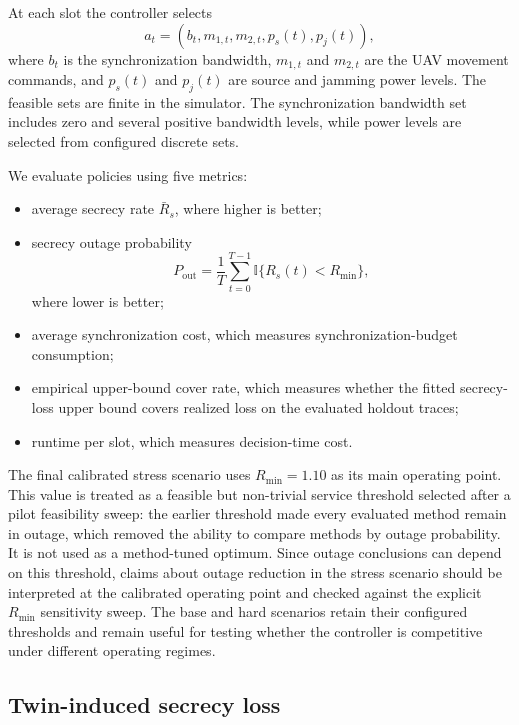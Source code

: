 At each slot the controller selects
\begin{equation}
    a_t=(b_t,m_{1,t},m_{2,t},p_s(t),p_j(t)),
\end{equation}
where $b_t$ is the synchronization bandwidth, $m_{1,t}$ and $m_{2,t}$ are the UAV movement commands, and $p_s(t)$ and $p_j(t)$ are source and jamming power levels. The feasible sets are finite in the simulator. The synchronization bandwidth set includes zero and several positive bandwidth levels, while power levels are selected from configured discrete sets.

We evaluate policies using five metrics:
\begin{itemize}
    \item average secrecy rate $\bar{R}_s$, where higher is better;
    \item secrecy outage probability
    \begin{equation}
        P_{\mathrm{out}}=\frac{1}{T}\sum_{t=0}^{T-1}\mathbb{I}\{R_s(t)<R_{\min}\},
    \end{equation}
    where lower is better;
    \item average synchronization cost, which measures synchronization-budget consumption;
    \item empirical upper-bound cover rate, which measures whether the fitted secrecy-loss upper bound covers realized loss on the evaluated holdout traces;
    \item runtime per slot, which measures decision-time cost.
\end{itemize}

The final calibrated stress scenario uses $R_{\min}=1.10$ as its main operating point. This value is treated as a feasible but non-trivial service threshold selected after a pilot feasibility sweep: the earlier threshold made every evaluated method remain in outage, which removed the ability to compare methods by outage probability. It is not used as a method-tuned optimum. Since outage conclusions can depend on this threshold, claims about outage reduction in the stress scenario should be interpreted at the calibrated operating point and checked against the explicit $R_{\min}$ sensitivity sweep. The base and hard scenarios retain their configured thresholds and remain useful for testing whether the controller is competitive under different operating regimes.

\subsection{Twin-induced secrecy loss}

